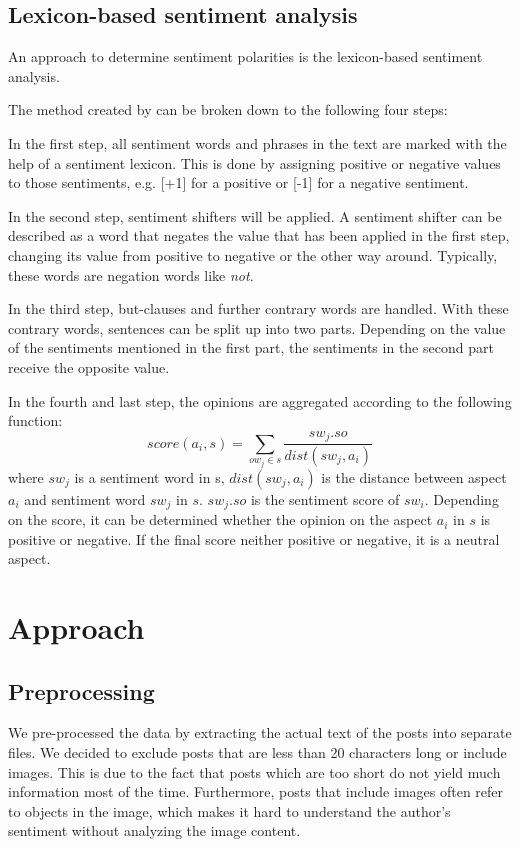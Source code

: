 \documentclass[10pt,a4paper]{article}
\begin{document}
		\subsection{Lexicon-based sentiment analysis}
		An approach to determine sentiment polarities is the lexicon-based sentiment analysis.
		
		The method created by \cite{Ding:2008:HLA:1341531.1341561} can be broken down to the following four steps: 
		
		In the first step, all sentiment words and phrases in the text are marked with the help of a sentiment lexicon. This is done by assigning positive or negative values to those sentiments, e.g. [+1] for a positive or [-1] for a negative sentiment.
		
		In the second step, sentiment shifters will be applied. A sentiment shifter can be described as a word that negates the value that has been applied in the first step, changing its value from positive to negative or the other way around. Typically, these words are negation words like \textit{not}. 
		
		In the third step, but-clauses and further contrary words are handled. With these contrary words, sentences can be split up into two parts. Depending on the value of the sentiments mentioned in the first part, the sentiments in the second part receive the opposite value.
		
		In the fourth and last step, the opinions are aggregated according to the following function:
		\begin{displaymath}
			score(a_i,s) = \sum_{ow_j \in s} \frac{sw_j.so}{dist(sw_j,a_i)}
		\end{displaymath}
		where $sw_j$ is a sentiment word in s, $dist(sw_j, a_i)$ is the distance between aspect $a_i$ and sentiment word $sw_j$ in $s$. $sw_j.so$ is the sentiment score of $sw_i$.  Depending on the score, it can be determined whether the opinion on the aspect $a_i$ in $s$ is positive or negative. If the final score neither positive or negative, it is a neutral aspect.
	
	
	\section{Approach}

		\subsection{Preprocessing}
		We pre-processed the data by extracting the actual text of the posts into separate files. We decided to exclude posts that are less than 20 characters long or include images. This is due to the fact that posts which are too short do not yield much information most of the time. Furthermore, posts that include images often refer to objects in the image, which makes it hard to understand the author's sentiment without analyzing the image content.
	
\end{document}
